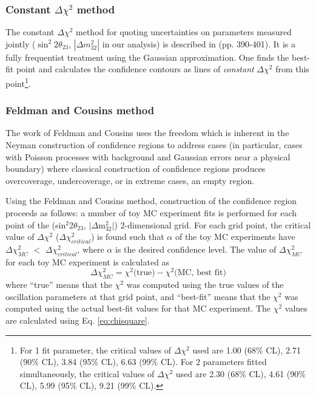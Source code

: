 \subsubsection {Constant $\Delta\chi^{2}$ method}
\label{sec:contour_construction_constdchi}

The constant $\Delta\chi^{2}$ method for quoting uncertainties on parameters measured jointly
($\sin^{2}2\theta_{23}$, $|\Delta m^{2}_{32}|$ in our analysis) is described in \cite{PDG2012} (pp. 390-401).
It is a fully frequentist treatment using the Gaussian approximation.
One finds the best-fit point and calculates the confidence contours as lines of {\em constant} $\Delta{\chi^{2}}$
from this point\footnote{
For 1 fit parameter, the critical values of $\Delta{\chi^{2}}$ used are 
1.00 (68\% CL), 2.71 (90\% CL), 3.84 (95\% CL), 6.63 (99\% CL).
For 2 parameters fitted simultaneously, the critical values of $\Delta{\chi^{2}}$ used are 
2.30 (68\% CL), 4.61 (90\% CL), 5.99 (95\% CL), 9.21 (99\% CL).
}.

\subsubsection {Feldman and Cousins method}
\label{sec:contour_construction_fc}

The work of Feldman and Cousins \cite{FeldmanCousins} 
uses the freedom which is inherent in the Neyman construction of confidence regions
to address cases 
(in particular, cases with
Poisson processes with background and Gaussian errors near a physical boundary)
where classical construction of confidence regions produces overcoverage, undercoverage, or
in extreme cases, an empty region.

Using the Feldman and Cousins method, construction of the confidence region proceeds as follows: a number of toy MC experiment 
fits is performed for each point of the (sin$^{2}$2$\theta_{23}$, $|\Delta$m$^{2}_{32}|$) 2-dimensional grid.
For each grid point, the critical value of $\Delta\chi^{2}$ ($\Delta\chi^{2}_{critical}$)
is found such that $\alpha$ of the toy MC experiments have $\Delta\chi^{2}_{MC}$ $<$ $\Delta\chi^{2}_{critical}$,
where $\alpha$ is the desired confidence level.
The value of $\Delta\chi^{2}_{MC}$ for each toy MC experiment is calculated as
\begin{equation}
\displaystyle
\Delta \chi^{2}_{MC} = \chi^{2} \textrm{(true)} - \chi^{2} \textrm{(MC, best fit)}
\label{eq:deltachi2}
\end{equation}
where
``true'' means that the $\chi^{2}$ was computed using the true values of the oscillation parameters at that grid point, and
``best-fit'' means that the $\chi^{2}$ was computed using the actual best-fit values for that MC experiment.
The $\chi^{2}$ values are calculated using Eq. \ref{eq:chisquare}.

